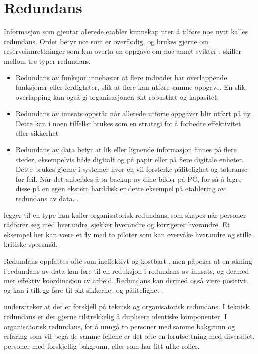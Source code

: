 \section{Redundans}
\label{sec:redundans}

Informasjon som gjentar allerede etabler kunnskap uten å tilføre noe nytt kalles redundans. Ordet betyr noe som er overflødig, og brukes gjerne om reserveinnrettninger som kan overta en oppgave om noe annet svikter \citep{Rosness}.  \citet{Cabitza05} skiller mellom tre typer redundans. 

\begin{itemize}
\item Redundans av funksjon innebærer at flere individer har overlappende funksjoner eller ferdigheter, slik at flere kan utføre samme oppgave. En slik overlapping kan også gi organisasjonen økt robusthet og kapasitet.
\item Redundans av innsats oppstår når allerede utførte oppgaver blir utført på ny. Dette kan i noen tilfeller brukes som en strategi for å forbedre effektivitet eller sikkerhet \citep{Rygh}
\item Redundans av data betyr at lik eller lignende informasjon finnes på flere steder, eksempelvis både digitalt og på papir eller på flere digitale enheter. Dette brukes gjerne i systemer hvor en vil forsterke pålitelighet og toleranse for feil. Når det anbefales å ta backup av dine bilder på PC, for så å lagre disse på en egen ekstern harddisk er dette eksempel på etablering av redundans av data. \citep{Rygh}.
\end{itemize}

\citet{Rosness} legger til en type han kaller organisatorisk redundans, som skapes når personer rådfører seg med hverandre, sjekker hverandre og korrigerer hverandre. Et eksempel her kan være et fly med to piloter som kan overvåke hverandre og stille kritiske spørsmål. 

\noindent
Redundans oppfattes ofte som ineffektivt og kostbart \citep{Rygh}, men \citet{Cabitza05} påpeker at en økning i redundans av data kan føre til en reduksjon i redundans av innsats, og dermed mer effektiv koordinasjon av arbeid. Redundans kan dermed også være positivt, og kan i tillegg føre til økt sikkerhet og pålitelighet \citep{Rygh}.

\noindent
\citet{Rosness} understreker at det er forskjell på teknisk og organisatorisk redundans. I teknisk redundans er det gjerne tilstrekkelig å duplisere identiske komponenter. I organisatorisk redundans, for å unngå to personer med samme bakgrunn og erfaring som vil begå de samme feilene er det ofte en forutsettning med diversitet, personer med forskjellig bakgrunn, eller som har litt ulike roller.
